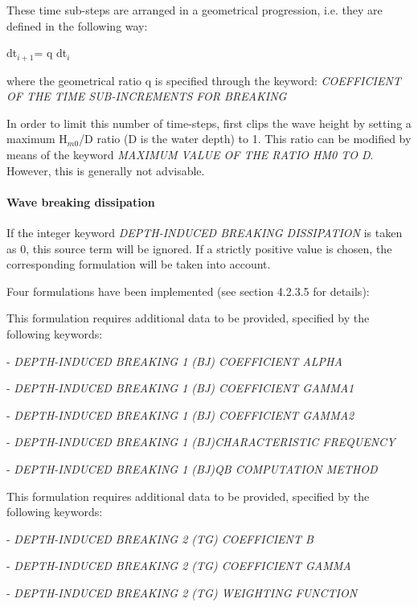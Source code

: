  These time sub-steps are arranged in a geometrical progression, i.e. they are defined in the following way:

dt${}_{i+1 }$= q dt${}_{i}$

 where the geometrical ratio q is specified through the keyword: \textit{COEFFICIENT OF THE TIME SUB-INCREMENTS FOR BREAKING}

 In order to limit this number of time-steps, \tomawac first clips the wave height by setting a maximum H${}_{m0}$/D ratio (D is the water depth) to 1. This ratio can be modified by means of the keyword \textit{MAXIMUM VALUE OF THE RATIO HM0 TO D}. However, this is generally not advisable.


\paragraph{ Wave breaking dissipation}

 If the integer keyword \textit{DEPTH-INDUCED BREAKING DISSIPATION} is taken as 0, this source term will be ignored. If a strictly positive value is chosen, the corresponding formulation will be taken into account.

 Four formulations have been implemented (see section 4.2.3.5 for details):

 \textbf{}

 This formulation requires additional data to be provided, specified by the following keywords:

 - \textit{DEPTH-INDUCED BREAKING 1 (BJ) COEFFICIENT ALPHA}

 - \textit{DEPTH-INDUCED BREAKING 1 (BJ) COEFFICIENT GAMMA1}

 - \textit{DEPTH-INDUCED BREAKING 1 (BJ) COEFFICIENT GAMMA2}

 - \textit{DEPTH-INDUCED BREAKING 1 (BJ)CHARACTERISTIC FREQUENCY }

 - \textit{DEPTH-INDUCED BREAKING 1 (BJ)QB COMPUTATION METHOD}

 \textit{}

 \textbf{}

 This formulation requires additional data to be provided, specified by the following keywords:

 - \textit{DEPTH-INDUCED BREAKING 2 (TG) COEFFICIENT B}

 - \textit{DEPTH-INDUCED BREAKING 2 (TG) COEFFICIENT GAMMA}

 - \textit{DEPTH-INDUCED BREAKING 2 (TG) WEIGHTING FUNCTION}

